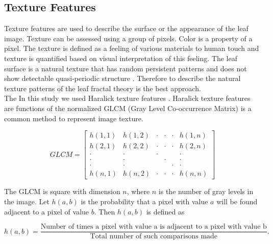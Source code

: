 \documentclass{article}
\begin{document}
\hypertarget{texture-features}{%
\subsection{Texture Features}\label{texture-features}}

Texture features are used to describe the surface or the
appearance of the leaf image. Texture can be assessed using a group of
pixels. Color is a property of a pixel. The texture is defined as a feeling of
various materials to human touch and texture is quantified based on
visual interpretation of this feeling. The leaf surface is a natural texture
that has random persistent patterns and does not show detectable
quasi-periodic structure \citep{articlee}. Therefore to
describe the natural texture patterns of the leaf fractal theory
\citep{articlee} is the best approach.\\
\hspace*{0.333em}\hspace*{0.333em}\hspace*{0.333em}\hspace*{0.333em}\hspace*{0.333em}\hspace*{0.333em}The
In this study we used Haralick texture features \citep{article31}. Haralick texture features  are functions of the normalized
GLCM (Gray Level Co-occurrence Matrix) is a common method to
represent image texture.

\[GLCM = \begin{bmatrix}
h(1,1) & h(1,2)  & \cdot &\cdot &\cdot & h(1,n) \\ 
h(2,1) & h(2,2)  & \cdot &\cdot &\cdot & h(2,n) \\ 
\cdot  & \cdot & \cdot  & & &\cdot\\ 
\cdot  & \cdot &  & \cdot& &\cdot\\ 
\cdot  & \cdot &  & & \cdot &\cdot\\ 
h(n,1) & h(n,2) & \cdot &\cdot &\cdot & h(n,n)
\end{bmatrix}\]

The GLCM is square with dimension \(n\), where \(n\) is the number
of gray levels in the image. Let \(h(a,b)\) is the probability that a
pixel with value \(a\) will be found adjacent to a pixel of value \(b\).
Then \(h(a,b)\) is defined as

\[h(a,b) = \frac{\text{Number of times a pixel with value a is adjacent to a pixel with value b}}{\text{Total number of such comparisons made}}.\]
\end{document}
